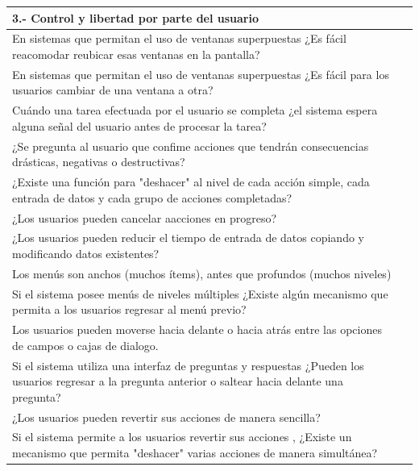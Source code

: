 \documentclass[stu, 12pt, letterpaper, donotrepeattitle, floatsintext, natbib]{apa7}
\begin{document}
\begin{longtable}{|>{\raggedright\arraybackslash}p{10cm}|>{\centering\arraybackslash}p{3cm}|}
    \textbf{3.- Control y libertad  por parte del usuario} & \\ \hline
    En sistemas que permitan el uso de ventanas superpuestas ¿Es fácil reacomodar reubicar esas ventanas en la pantalla? & \\ \hline
    En sistemas que permitan el uso de ventanas superpuestas ¿Es fácil para los usuarios cambiar de una ventana a otra? & \\ \hline
    Cuándo una tarea efectuada por el usuario se completa ¿el sistema espera alguna señal del usuario antes de procesar la tarea? & \\ \hline
    ¿Se pregunta al usuario que confime acciones que tendrán consecuencias drásticas, negativas o destructivas? & \\ \hline
    ¿Existe una función para "deshacer" al nivel de cada acción simple, cada entrada de datos y cada grupo de acciones completadas? & \\ \hline
    ¿Los usuarios pueden cancelar aacciones en progreso? & \\ \hline
    ¿Los usuarios pueden reducir el tiempo de entrada de datos copiando y modificando datos existentes? & \\ \hline
    Los menús son anchos (muchos ítems), antes que profundos (muchos niveles) & \\ \hline
    Si el sistema posee menús de niveles múltiples ¿Existe algún mecanismo que permita a los usuarios regresar al menú previo? & \\ \hline
    Los usuarios pueden moverse hacia delante o hacia atrás entre las opciones de campos o cajas de dialogo. & \\ \hline
    Si el sistema utiliza una interfaz de preguntas y respuestas ¿Pueden los usuarios regresar a la pregunta anterior o saltear hacia delante una pregunta? & \\ \hline
    ¿Los usuarios pueden revertir sus acciones de manera sencilla? & \\ \hline
    Si el sistema permite a los usuarios revertir sus acciones , ¿Existe un mecanismo que permita "deshacer" varias acciones de manera simultánea?  & \\ \hline


\end{longtable}
\end{document}
